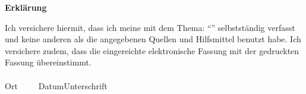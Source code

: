 





 






 

\newpage
\thispagestyle{empty}
\begin{framed}
\begin{center}
\Large\bfseries Erklärung
\end{center}
\medskip
\noindent
Ich versichere hiermit, dass ich meine \Was mit dem Thema:
\enquote{\Titel}
selbstständig verfasst und keine anderen als die angegebenen Quellen und Hilfsmittel benutzt habe. Ich versichere zudem, dass die eingereichte elektronische Fassung mit der gedruckten Fassung übereinstimmt.
\vspace{3cm}
\\
\noindent
\underline{\hspace{4cm}}\hfill\underline{\hspace{6cm}}\\
Ort~~~~~Datum\hfill Unterschrift\hspace{4cm}
\end{framed} 

